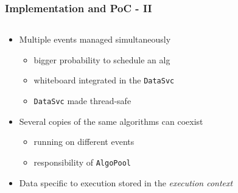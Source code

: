 \documentclass[9pt]{beamer}
\begin{document}
\begin{frame}
\frametitle{Implementation and PoC - II}


  \begin{columns}
    \begin{column}{0.7\textwidth}

      \begin{block}{}
        \begin{itemize}
          \item Multiple events managed simultaneously
          \begin{itemize}
             \item bigger probability to schedule an alg
             \item whiteboard integrated in the \texttt{DataSvc}
             \item \texttt{DataSvc} made thread-safe
          \end{itemize}
          \item Several copies of the same algorithms can coexist
          \begin{itemize}
             \item running on different events
             \item responsibility of \texttt{AlgoPool}
          \end{itemize}
          \item Data specific to execution stored in the \emph{execution context}
        \end{itemize}
      \end{block}


\end{column}
\end{columns}
\end{frame}
\end{document}
